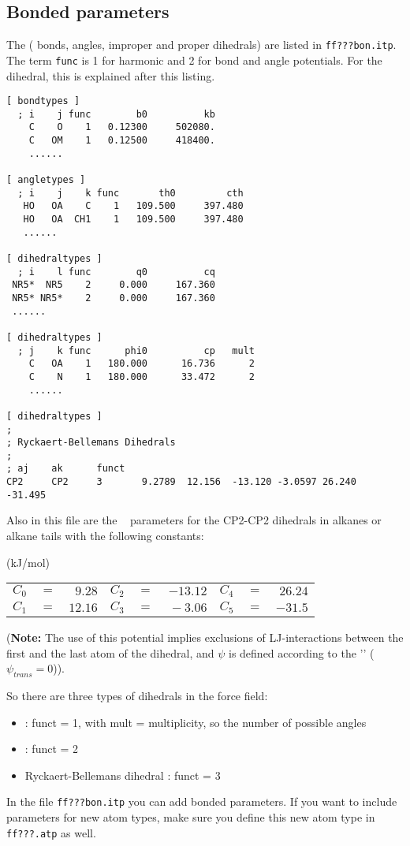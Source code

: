 \subsection{Bonded parameters}
\label{subsec:bondparam}
The  ({\ie} bonds, angles, improper and proper
dihedrals) are listed in {\tt ff???bon.itp}. The term {\tt func} is 1 for
harmonic and 2 for  bond and angle potentials.
For the dihedral, this is explained after this listing.
{\small\begin{verbatim}
[ bondtypes ]
  ; i    j func        b0          kb
    C    O    1   0.12300     502080.
    C   OM    1   0.12500     418400.
    ......

[ angletypes ]
  ; i    j    k func       th0         cth
   HO   OA    C    1   109.500     397.480
   HO   OA  CH1    1   109.500     397.480
   ......

[ dihedraltypes ]
  ; i    l func        q0          cq
 NR5*  NR5    2     0.000     167.360
 NR5* NR5*    2     0.000     167.360
 ......

[ dihedraltypes ]
  ; j    k func      phi0          cp   mult
    C   OA    1   180.000      16.736      2
    C    N    1   180.000      33.472      2
    ......

[ dihedraltypes ]
;
; Ryckaert-Bellemans Dihedrals
;
; aj    ak      funct
CP2     CP2     3       9.2789  12.156  -13.120 -3.0597 26.240  -31.495
\end{verbatim}}
Also in this file are the ~\cite{Ryckaert78} 
parameters for
the CP2-CP2 dihedrals in alkanes or alkane tails with the following
constants:

\begin{center}
(kJ/mol)\\
\begin{tabular}{llrllrllr}
$C_0$ & $=$ & $~ 9.28$ & $C_2$ & $=$ & $-13.12$ & $C_4$ & $=$ & $ 26.24$ \\
$C_1$ & $=$ & $ 12.16$ & $C_3$ & $=$ & $~-3.06$ & $C_5$ & $=$ & $-31.5 $ \\
\end{tabular}
\end{center}

({\bf Note:} The use of this potential implies exclusions of LJ-interactions
between the first and the last atom of the dihedral, and $\psi$ is defined
according to the '' ($\psi_{trans}=0$)).

So there are three types of dihedrals in the {\gromacs} force field:
\begin{itemize}
\item {} : funct = 1, with mult = multiplicity, so the
                                   number of possible angles
\item {} : funct = 2
\item Ryckaert-Bellemans dihedral : funct = 3
\end{itemize}
In the file {\tt ff???bon.itp} you can add bonded parameters. If you
want to include parameters for new atom types, make sure you define
this new atom type in {\tt ff???.atp} as well.

